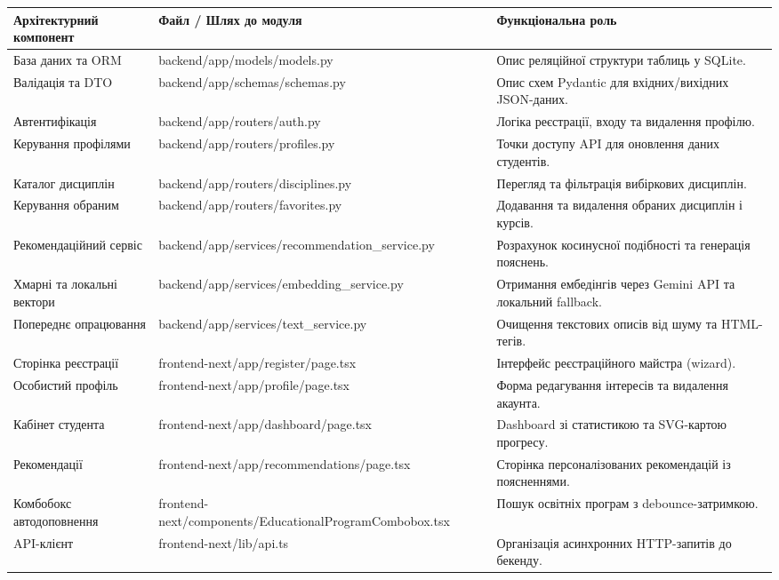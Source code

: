 \documentclass[
]{article}
\newcounter{none} %
\begin{document}
{\def\LTcaptype{none} %
\begin{longtable}[]{@{}
  >{\raggedright\arraybackslash}p{}
  >{\raggedright\arraybackslash}p{}
  >{\raggedright\arraybackslash}p{}@{}}
\toprule\noalign{}
\begin{minipage}[b]{\linewidth}\raggedright
\textbf{Архітектурний компонент}
\end{minipage} & \begin{minipage}[b]{\linewidth}\raggedright
\textbf{Файл / Шлях до модуля}
\end{minipage} & \begin{minipage}[b]{\linewidth}\raggedright
\textbf{Функціональна роль}
\end{minipage} \\
\midrule\noalign{}
\endhead
\bottomrule\noalign{}
\endlastfoot
База даних та ORM & backend/app/models/models.py & Опис реляційної
структури таблиць у SQLite. \\
Валідація та DTO & backend/app/schemas/schemas.py & Опис схем Pydantic
для вхідних/вихідних JSON-даних. \\
Автентифікація & backend/app/routers/auth.py & Логіка реєстрації, входу
та видалення профілю. \\
Керування профілями & backend/app/routers/profiles.py & Точки доступу
API для оновлення даних студентів. \\
Каталог дисциплін & backend/app/routers/disciplines.py & Перегляд та
фільтрація вибіркових дисциплін. \\
Керування обраним & backend/app/routers/favorites.py & Додавання та
видалення обраних дисциплін і курсів. \\
Рекомендаційний сервіс & backend/app/services/recommendation\_service.py
& Розрахунок косинусної подібності та генерація пояснень. \\
Хмарні та локальні вектори & backend/app/services/embedding\_service.py
& Отримання ембедінгів через Gemini API та локальний fallback. \\
Попереднє опрацювання & backend/app/services/text\_service.py & Очищення
текстових описів від шуму та HTML-тегів. \\
Сторінка реєстрації & frontend-next/app/register/page.tsx & Інтерфейс
реєстраційного майстра (wizard). \\
Особистий профіль & frontend-next/app/profile/page.tsx & Форма
редагування інтересів та видалення акаунта. \\
Кабінет студента & frontend-next/app/dashboard/page.tsx & Dashboard зі
статистикою та SVG-картою прогресу. \\
Рекомендації & frontend-next/app/recommendations/page.tsx & Сторінка
персоналізованих рекомендацій із поясненнями. \\
Комбобокс автодоповнення &
frontend-next/components/EducationalProgramCombobox.tsx & Пошук освітніх
програм з debounce-затримкою. \\
API-клієнт & frontend-next/lib/api.ts & Організація асинхронних
HTTP-запитів до бекенду. \\
\end{longtable}
}
\end{document}
